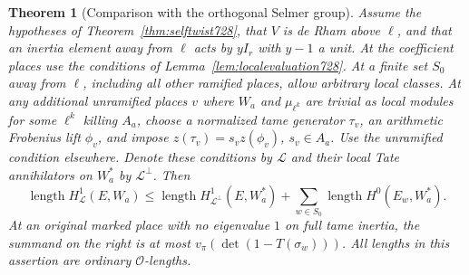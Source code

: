 \documentclass[a4paper,11pt]{article}
\newtheorem{theorem}[proposition]{Theorem}
\theoremstyle{definition}
\theoremstyle{remark}
\numberwithin{equation}{section}
\begin{document}
\begin{theorem}[Comparison with the orthogonal Selmer group]\leavevmode
\label{thm:balancedcount728}
Assume the hypotheses of Theorem~\ref{thm:selftwist728}, that \(V\) is
de Rham above \(\ell\), and that an inertia element away from \(\ell\)
acts by \(yI_r\) with \(y-1\) a unit. At the coefficient places use
the conditions of Lemma~\ref{lem:localevaluation728}. At a finite set
\(S_0\) away from \(\ell\), including all other ramified places, allow
arbitrary local classes. At any additional unramified places \(v\)
where \(W_a\) and \(\mu_{\ell^k}\) are trivial as local modules for
some \(\ell^k\) killing \(A_a\), choose a normalized tame generator
\(\tau_v\), an arithmetic Frobenius lift \(\phi_v\), and impose
\(z(\tau_v)=s_v z(\phi_v)\), \(s_v\in A_a\). Use the unramified
condition elsewhere. Denote these conditions by \(\mathcal L\) and
their local Tate annihilators on \(W_a^*\) by \(\mathcal L^\perp\).
Then
\[
  \operatorname{length} H^1_{\mathcal L}(E,W_a)
  \le \operatorname{length} H^1_{\mathcal L^\perp}(E,W_a^*)
         +\sum_{w\in S_0}\operatorname{length}H^0(E_w,W_a^*) .
\]
At an original marked place with no eigenvalue \(1\) on full tame
inertia, the summand on the right is at most
\(v_\pi(\det(1-T(\sigma_w)))\). All lengths in this assertion are
ordinary \(\mathcal O\)-lengths.
\end{theorem}
\end{document}
